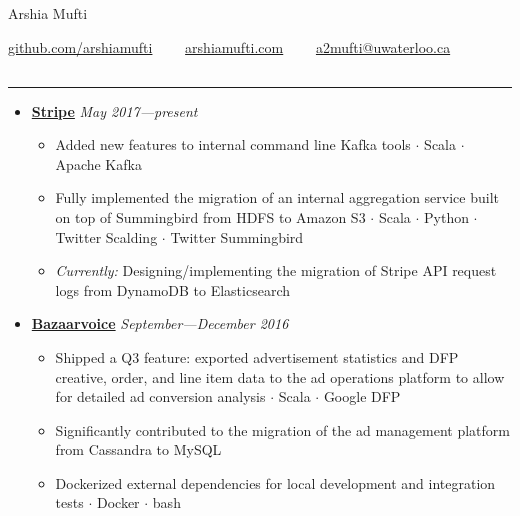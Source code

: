 \documentclass[5pt,letterpaper]{article}
\newcommand{\dt}{$\cdot$ }
\begin{document}
\begin{center}
  {\huge Arshia Mufti}


  \href{https://github.com/arshiamufti/}{github.com/arshiamufti}\ \ \textbullet
  \ \ \href{http://arshiamufti.com}{arshiamufti.com}\ \ \textbullet
  \ \ \href{mailto:a2mufti@uwaterloo.ca}{a2mufti@uwaterloo.ca}

\end{center}
\vspace{-2.0em}
\subsection*{}
\hrule
\vspace{1.0em}
\begin{itemize}[leftmargin=1em, noitemsep]

  \item[]
    {\href{https://stripe.com}{\textbf{Stripe}} \hfill
    \emph{May 2017---present}}

    \begin{itemize}[label=\textbullet, noitemsep, nosep]
      \item Added new features to internal command line Kafka tools \dt Scala 
        \dt Apache Kafka
      \item Fully implemented the migration of an internal aggregation
        service built on top of Summingbird from HDFS to Amazon S3 \dt Scala
        \dt Python \dt Twitter Scalding \dt Twitter Summingbird
      \item \emph{Currently:} Designing/implementing the migration of Stripe
        API request logs from DynamoDB to Elasticsearch
    \end{itemize}

  \item[]
    {\href{http://www.bazaarvoice.com}{\textbf{Bazaarvoice}} \hfill
    \emph{September---December 2016}}

    \begin{itemize}[label=\textbullet, noitemsep, nosep]
      \item Shipped a Q3 feature: exported advertisement statistics and DFP
        creative, order, and line item data to the ad operations platform to
        allow for detailed ad conversion analysis \dt Scala \dt Google DFP
      \item Significantly contributed to the migration of the ad
        management platform from Cassandra to MySQL
      \item Dockerized external dependencies for local development and
        integration tests \dt Docker \dt bash
    \end{itemize}


\end{itemize}
\end{document}
